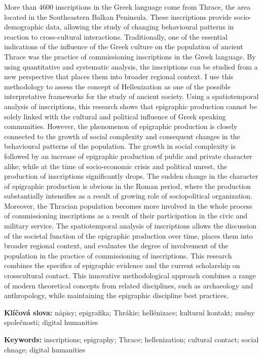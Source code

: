 More than 4600 inscriptions in the Greek language come from Thrace, the area located in the Southeastern Balkan Peninsula. These inscriptions provide socio-demographic data, allowing the study of changing behavioural patterns in reaction to cross-cultural interactions. Traditionally, one of the essential indications of the influence of the Greek culture on the population of ancient Thrace was the practice of commissioning inscriptions in the Greek language. By using quantitative and systematic analysis, the inscriptions can be studied from a new perspective that places them into broader regional context. I use this methodology to assess the concept of Hellenization as one of the possible interpretative frameworks for the study of ancient society. Using a spatiotemporal analysis of inscriptions, this research shows that epigraphic production cannot be solely linked with the cultural and political influence of Greek speaking communities. However, the phenomenon of epigraphic production is closely connected to the growth of social complexity and consequent changes in the behavioural patterns of the population. The growth in social complexity is followed by an increase of epigraphic production of public and private character alike; while at the time of socio-economic crisis and political unrest, the production of inscriptions significantly drops. The sudden change in the character of epigraphic production is obvious in the Roman period, where the production substantially intensifies as a result of growing role of sociopolitical organization. Moreover, the Thracian population becomes more involved in the whole process of commissioning inscriptions as a result of their participation in the civic and military service. The spatiotemporal analysis of inscriptions allows the discussion of the societal function of the epigraphic production over time, places them into broader regional context, and evaluates the degree of involvement of the population in the practice of commissioning of inscriptions. This research combines the specifics of epigraphic evidence and the current scholarship on crosscultural contact. This innovative methodological approach combines a range of modern theoretical concepts from related disciplines, such as archaeology and anthropology, while maintaining the epigraphic discipline best practices.

{\bf Klíčová slova:} nápisy; epigrafika; Thrákie; hellénizace; kulturní kontakt; změny společnosti; digital humanities

{\bf Keywords:} inscriptions; epigraphy; Thrace; hellenization; cultural contact; social chnage; digital humanities

